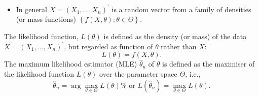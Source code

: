 \documentclass[notes=show]{beamer}
\begin{document}
\begin{frame}%


\begin{itemize}
\item In general $X=\left( X_{1},...,X_{n}\right) ^{\prime }$ is a random
vector from a family of densities (or mass functions) $\left\{ f\left(
X,\theta \right) :\theta \in \Theta \right\} $.
\end{itemize}

\begin{definition}
The likelihood function, $L\left( \theta \right) $ is defined as the density
(or mass) of the data $X=\left( X_{1},...,X_{n}\right) ^{\prime }$, but
regarded as function of $\theta $ rather than $X:$%
\begin{equation*}
L\left( \theta \right) =f\left( X,\theta \right) .
\end{equation*}%
The maximum likelihood estimator (MLE) $\hat{\theta}_{n}$ of $\theta $ is
defined as the maximiser of the likelihood function $L\left( \theta \right) $
over the parameter space $\Theta $, i.e., 
\begin{equation*}
\hat{\theta}_{n}=\arg \max_{\theta \in \Theta }L\left( \theta \right) \text{%
\ \ \ or\ \ \ }L\left( \hat{\theta}_{n}\right) =\max_{\theta \in \Theta
}L\left( \theta \right) .
\end{equation*}
\end{definition}

\end{frame}%
\end{document}
